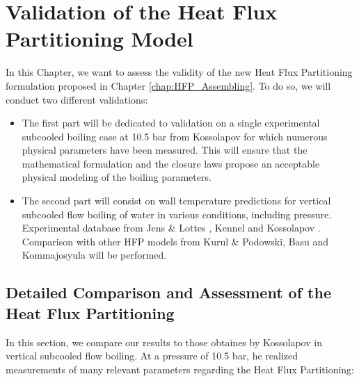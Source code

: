 
\chapter{Validation of the Heat Flux Partitioning Model} %

\label{ch:HFP_validation} %

\minitoc


In this Chapter, we want to assess the validity of the new Heat Flux Partitioning formulation proposed in Chapter \ref{chap:HFP_Assembling}. To do so, we will conduct two different validations:

\begin{itemize}
\setlength{\itemsep}{8pt}
\item The first part will be dedicated to validation on a single experimental subcooled boiling case at 10.5 bar from Kossolapov \cite{kossolapov_experimental_2021} for which numerous physical parameters have been measured. This will ensure that the mathematical formulation and the closure laws propose an acceptable physical modeling of the boiling parameters.

\item The second part will consist on wall temperature predictions for vertical subcooled flow boiling of water in various conditions, including pressure. Experimental database from Jens \& Lottes \cite{jens_analysis_1951}, Kennel \cite{kennel_local_1949} and Kossolapov \cite{kossolapov_experimental_2021}. Comparison with other HFP models from Kurul \& Podowski, Basu and Kommajosyula will be performed.
\end{itemize}


\section{Detailed Comparison and Assessment of the Heat Flux Partitioning}
\label{sec:hfp_valid_fullkoss}

In this section, we compare our results to those obtaines by Kossolapov \cite{kossolapov_experimental_2021} in vertical subcooled flow boiling. At a pressure of 10.5 bar, he realized measurements of many relevant parameters regarding the Heat Flux Partitioning:

